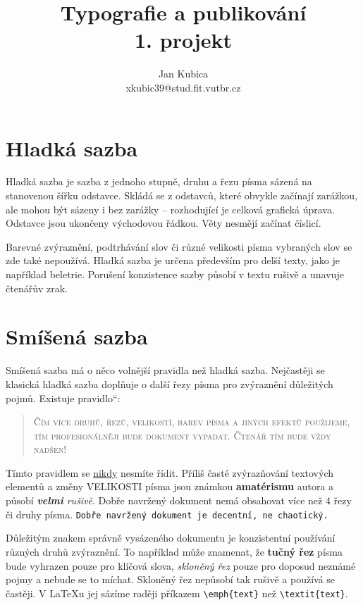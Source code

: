 \documentclass[11pt, twocolumn, a4paper]{article}
\title{Typografie a publikování\\1. projekt}
\author{Jan Kubica\\xkubic39@stud.fit.vutbr.cz}
\date{}
\providecommand{\uv}[1]{\quotedblbase #1\textquotedblleft}
\begin{document}
\maketitle

\section{Hladká sazba}

Hladká sazba je sazba z jednoho stupně, druhu a řezu písma sázená na stanovenou šířku odstavce. Skládá se z odstavců, které obvykle začínají zarážkou, ale mohou být sázeny i bez zarážky -- rozhodující je celková grafická úprava. Odstavce jsou ukončeny východovou řádkou. Věty nesmějí začínat číslicí.

Barevné zvýraznění, podtrhávání slov či různé velikosti písma vybraných slov se zde také nepoužívá. Hladká sazba je určena především pro delší texty, jako je například beletrie. Porušení konzistence sazby \mbox{působí} v textu rušivě a unavuje čtenářův zrak.

\section{Smíšená sazba}

Smíšená sazba má o něco volnější pravidla než hladká sazba. Nejčastěji se klasická hladká sazba doplňuje o další řezy písma pro zvýraznění důležitých pojmů. Existuje \uv{pravidlo}:

\begin{quotation}
\textsc{Čím více druhů, řezů, velikostí, \mbox{barev} písma a jiných efektů použije\-me, tím profesionálněji bude dokument vypadat. Čtenář tím bude vždy nadšen!}
\end{quotation}

Tímto pravidlem se \underline{nikdy} nesmíte řídit. \mbox{Příliš} časté zvýrazňování textových elementů a změny {\huge V}{\LARGE E}{\Large L}{\large I}{\normalsize K}{\small O}{\footnotesize S}{\scriptsize T}{\tiny I} písma {\Large jsou} {\LARGE známkou} {\huge \textbf{a\-ma\-té\-ris\-mu}} autora a působí \emph{\textbf{velmi} rušivě}. Dobře navržený dokument nemá obsahovat více než 4 řezy či druhy písma. \texttt{Dobře navržený dokument je decentní, ne chaotický.}

Důležitým znakem správně vysázeného dokumentu je konzistentní používání různých druhů zvýraznění. To například může znamenat, že \textbf{tučný řez} písma bude vyhrazen pouze pro klíčová slova, \emph{skloněný řez} pouze pro doposud neznámé pojmy a nebude se to míchat. Skloněný řez nepůsobí tak rušivě a používá se častěji. V \LaTeX u jej sázíme raději příkazem \verb|\emph{text}| než \verb|\textit{text}|.
\end{document}
